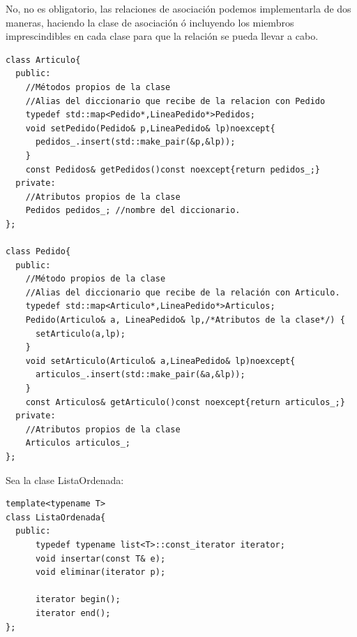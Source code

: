 \begin{enumerate}[label = \alph*)]
  No, no es obligatorio, las relaciones de asociación podemos implementarla de dos maneras, haciendo la clase de asociación ó incluyendo los miembros imprescindibles en cada clase para que la relación se pueda llevar a cabo.
\begin{verbatim}
class Articulo{
  public:
    //Métodos propios de la clase
    //Alias del diccionario que recibe de la relacion con Pedido
    typedef std::map<Pedido*,LineaPedido*>Pedidos;
    void setPedido(Pedido& p,LineaPedido& lp)noexcept{
      pedidos_.insert(std::make_pair(&p,&lp));
    }
    const Pedidos& getPedidos()const noexcept{return pedidos_;}
  private:
    //Atributos propios de la clase
    Pedidos pedidos_; //nombre del diccionario.
};

class Pedido{
  public:
    //Método propios de la clase
    //Alias del diccionario que recibe de la relación con Articulo.
    typedef std::map<Articulo*,LineaPedido*>Articulos;
    Pedido(Articulo& a, LineaPedido& lp,/*Atributos de la clase*/) {
      setArticulo(a,lp);
    }
    void setArticulo(Articulo& a,LineaPedido& lp)noexcept{
      articulos_.insert(std::make_pair(&a,&lp));
    }
    const Articulos& getArticulo()const noexcept{return articulos_;}
  private:
    //Atributos propios de la clase
    Articulos articulos_;
};
\end{verbatim}
\end{enumerate}
\newpage
{} Sea la clase ListaOrdenada:
\begin{center}
  \begin{lstlisting}[frame = single]
template<typename T>
class ListaOrdenada{
  public:
      typedef typename list<T>::const_iterator iterator;
      void insertar(const T& e);
      void eliminar(iterator p);

      iterator begin();
      iterator end();
};
  \end{lstlisting}
\end{center}

